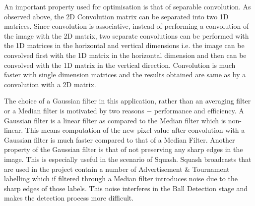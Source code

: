 \documentclass[a4paper]{article}
\begin{document}
An important property used for optimisation is that of separable convolution. As observed above, the 2D Convolution matrix can be separated into two 1D matrices. Since convolution is associative, instead of performing a convolution of the image with the 2D matrix, two separate convolutions can be performed with the 1D matrices in the horizontal and vertical dimensions i.e. the image can be convolved first with the 1D matrix in the horizontal dimension and then can be convolved with the 1D matrix in the vertical direction. Convolution is much faster with single dimension matrices and the results obtained are same as by a convolution with a 2D matrix. %




\par
The choice of a Gaussian filter in this application, rather than an averaging filter or a Median filter is motivated by two reasons $-$ performance and efficiency. A Gaussian filter is  a linear filter as compared to the Median filter which is non-linear. This means computation of the new pixel value after convolution with a Gaussian filter is much faster compared to that of a Median Filter.
Another property of the Gaussian filter is that of not preserving any sharp edges in the image. This is especially useful in the scenario of Squash. Squash broadcasts that are used in the project contain a number of Advertisement \& Tournament labelling which if filtered through a Median filter introduces noise due to the sharp edges of those labels. This noise interferes in the Ball Detection stage and makes the detection process more difficult.  
\end{document}
